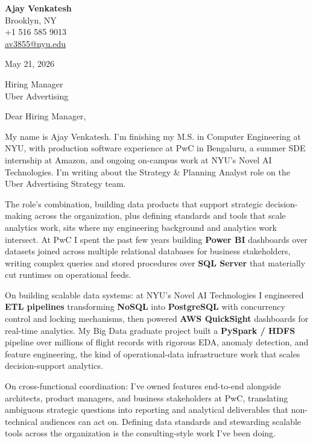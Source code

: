 \documentclass[letterpaper,11pt]{article}
\begin{document}
\begin{flushleft}
\textbf{\large Ajay Venkatesh} \\
Brooklyn, NY \\
+1 516 585 9013 \\
\href{mailto:av3855@nyu.edu}{av3855@nyu.edu}
\end{flushleft}
\vspace{10pt}
May 21, 2026
\vspace{6pt}

Hiring Manager \\
Uber Advertising

\vspace{10pt}

Dear Hiring Manager,

My name is Ajay Venkatesh. I'm finishing my M.S. in Computer Engineering at NYU, with production software experience at PwC in Bengaluru, a summer SDE internship at Amazon, and ongoing on-campus work at NYU's Novel AI Technologies. I'm writing about the Strategy \& Planning Analyst role on the Uber Advertising Strategy team.

The role's combination, building data products that support strategic decision-making across the organization, plus defining standards and tools that scale analytics work, sits where my engineering background and analytics work intersect. At PwC I spent the past few years building \textbf{Power BI} dashboards over datasets joined across multiple relational databases for business stakeholders, writing complex queries and stored procedures over \textbf{SQL Server} that materially cut runtimes on operational feeds.

On building scalable data systems: at NYU's Novel AI Technologies I engineered \textbf{ETL pipelines} transforming \textbf{NoSQL} into \textbf{PostgreSQL} with concurrency control and locking mechanisms, then powered \textbf{AWS QuickSight} dashboards for real-time analytics. My Big Data graduate project built a \textbf{PySpark / HDFS} pipeline over millions of flight records with rigorous EDA, anomaly detection, and feature engineering, the kind of operational-data infrastructure work that scales decision-support analytics.

On cross-functional coordination: I've owned features end-to-end alongside architects, product managers, and business stakeholders at PwC, translating ambiguous strategic questions into reporting and analytical deliverables that non-technical audiences can act on. Defining data standards and stewarding scalable tools across the organization is the consulting-style work I've been doing.
\end{document}
